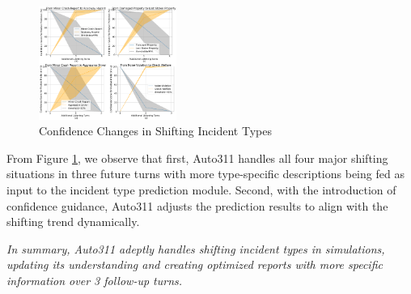 
\begin{figure}[h]
    \centering
    \includegraphics[width=0.40\textwidth]{figures/conf_curve.png}
    \caption{Confidence Changes in Shifting Incident Types}
    \label{fig:conf_curve}
    \vspace{-0.5cm}
\end{figure}

From Figure \ref{fig:conf_curve}, we observe that first, Auto311 handles all four major shifting situations in three future turns with more type-specific descriptions being fed as input to the incident type prediction module. Second, with the introduction of confidence guidance, Auto311 adjusts the prediction results to align with the shifting trend dynamically.

\textit{In summary, Auto311 adeptly handles shifting incident types in simulations, updating its understanding and creating optimized reports with more specific information over 3 follow-up turns.}

